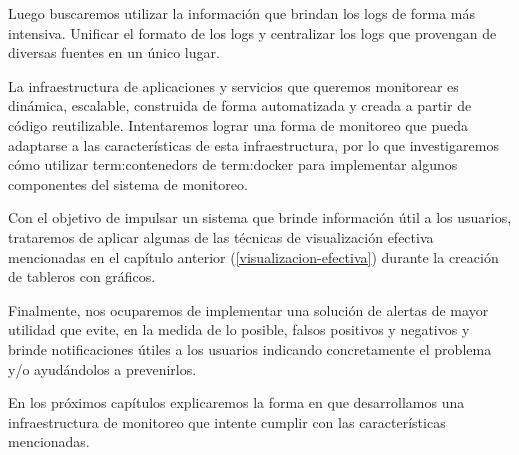 Luego buscaremos utilizar la información que brindan los logs de forma más
intensiva. Unificar el formato de los logs y centralizar los logs que provengan
de diversas fuentes en un único lugar.

La infraestructura de aplicaciones y servicios que queremos monitorear es
dinámica, escalable, construida de forma automatizada y creada a partir de
código reutilizable. Intentaremos lograr una forma de monitoreo que pueda
adaptarse a las características de esta infraestructura, por lo que
investigaremos cómo utilizar \glspl{term:contenedor} de \gls{term:docker} para
implementar algunos componentes del sistema de monitoreo.

Con el objetivo de impulsar un sistema que brinde información útil a los
usuarios, trataremos de aplicar algunas de las técnicas de visualización
efectiva mencionadas en el capítulo anterior
(\autoref{visualizacion-efectiva}) durante la creación de tableros con
gráficos.

Finalmente, nos ocuparemos de implementar una solución de alertas de mayor
utilidad que evite, en la medida de lo posible, falsos positivos y negativos y
brinde notificaciones útiles a los usuarios indicando concretamente el problema
y/o ayudándolos a prevenirlos.

En los próximos capítulos explicaremos la forma en que desarrollamos una
infraestructura de monitoreo que intente cumplir con las características
mencionadas.
